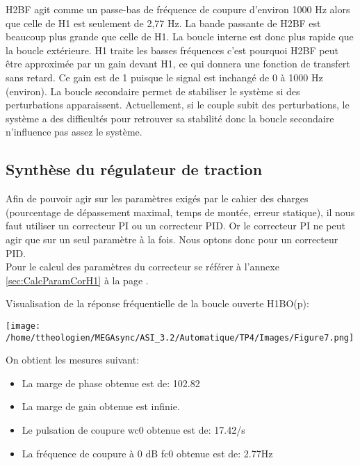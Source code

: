 \documentclass[a4paper,12pt]{article}
\begin{document}
			\par H2BF agit comme un passe-bas de fréquence de coupure d'environ 1000 Hz alors que celle de H1 est seulement de 2,77 Hz.
			La bande passante de H2BF est beaucoup plus grande que celle de H1.
			La boucle interne est donc plus rapide que la boucle extérieure.
			H1 traite les basses fréquences c'est pourquoi H2BF peut être approximée par un gain devant H1, ce qui donnera une fonction de transfert sans retard.
			Ce gain est de 1 puisque le signal est inchangé de 0 à 1000 Hz (environ).
			La boucle secondaire permet de stabiliser le système si des perturbations apparaissent.
			Actuellement, si le couple subit des perturbations, le système a des difficultés pour retrouver sa stabilité donc la boucle secondaire n'influence pas assez le système.
			\pagebreak

		\subsection{Synthèse du régulateur de traction}
			\label{sub:syntRegTrac}
			\par Afin de pouvoir agir sur les paramètres exigés par le cahier des charges (pourcentage de dépassement maximal, temps de montée, erreur statique), il nous faut utiliser un correcteur PI ou un correcteur PID.
			Or le correcteur PI ne peut agir que sur un seul paramètre à la fois.
			Nous optons donc pour un correcteur PID.\\
			Pour le calcul des paramètres du correcteur se référer à l'annexe \ref{sec:CalcParamCorH1} à la page \pageref{sec:CalcParamCorH1}.\\

			\par Visualisation de la réponse fréquentielle de la boucle ouverte H1BO(p):
			\begin{center}
				\texttt{[image: /home/ttheologien/MEGAsync/ASI\_3.2/Automatique/TP4/Images/Figure7.png]}
			\end{center}

			\par On obtient les mesures suivant:
			\begin{itemize}
				\item La marge de phase obtenue est de: 102.82\degre
				\item La marge de gain obtenue est infinie.
				\item Le pulsation de coupure wc0 obtenue est de: 17.42/s
				\item La fréquence de coupure à 0 dB fc0 obtenue est de: 2.77Hz\\
			\end{itemize}
			\pagebreak
\end{document}
